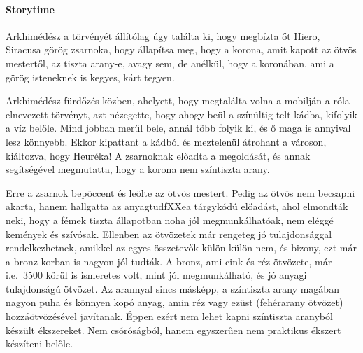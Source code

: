 \documentclass[12pt,a4paper]{scrartcl}
\begin{document}
\footnotesize
\paragraph{Storytime} Arkhimédész a törvényét állítólag úgy találta ki, hogy megbízta őt Hiero, Siracusa görög zsarnoka, hogy állapítsa meg, hogy a korona, amit kapott az ötvös mestertől, az tiszta arany-e, avagy sem, de anélkül, hogy a koronában, ami a görög isteneknek is kegyes, kárt tegyen.

Arkhimédész fürdőzés közben, ahelyett, hogy megtalálta volna a mobilján a róla elnevezett törvényt, azt nézegette, hogy ahogy beül a színültig telt kádba, kifolyik a víz belőle. Mind jobban merül bele, annál több folyik ki, és ő maga is annyival lesz könnyebb. Ekkor kipattant a kádból és meztelenül átrohant a városon, kiáltozva, hogy Heuréka! A zsarnoknak előadta a megoldását, és annak segítségével megmutatta, hogy a korona nem színtiszta arany.

Erre a zsarnok bepöccent és leölte az ötvös mestert. Pedig az ötvös nem becsapni akarta, hanem hallgatta az anyagtudfXXea tárgykódú előadást, ahol elmondták neki, hogy a fémek tiszta állapotban noha jól megmunkálhatóak, nem eléggé kemények és szívósak. Ellenben az ötvözetek már rengeteg jó tulajdonsággal rendelkezhetnek, amikkel az egyes összetevők külön-külön nem, és bizony, ezt már a bronz korban is nagyon jól tudták. A bronz, ami cink és réz ötvözete, már i.e.\ 3500 körül is ismeretes volt, mint jól megmunkálható, és jó anyagi tulajdonságú ötvözet. Az arannyal sincs másképp, a színtiszta arany magában nagyon puha és könnyen kopó anyag, amin réz vagy ezüst (fehérarany ötvözet) hozzáötvözésével javítanak. Éppen ezért nem lehet kapni színtiszta aranyból készült ékszereket. Nem csóróságból, hanem egyszerűen nem praktikus ékszert készíteni belőle.
\normalsize
\end{document}
